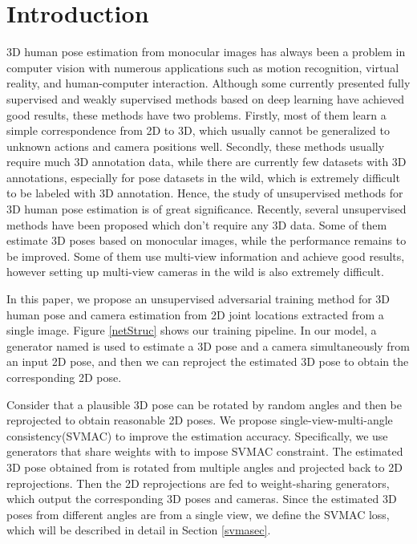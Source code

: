 \documentclass[10pt,twocolumn,letterpaper]{article}
\begin{document}
\section{Introduction}
3D human pose estimation from monocular images has always been a problem in computer vision\cite{0Computational, 1983Model} with numerous applications such as motion recognition, virtual reality, and human-computer interaction. Although some currently presented fully supervised and weakly supervised methods based on deep learning have achieved good results\cite{2017Exploiting, 2017A, 2017VNect, ferrari_integral_2018,  2017Lifting}, these methods have two problems. Firstly, most of them learn a simple correspondence from 2D to 3D, which usually cannot be generalized to unknown actions and camera positions well. Secondly, these methods usually require much 3D annotation data, while there are currently few datasets with 3D annotations, especially for pose datasets in the wild, which is extremely difficult to be labeled with 3D annotation. 
Hence, the study of unsupervised methods for 3D human pose estimation is of great significance. 
Recently, several unsupervised methods have been proposed which don't require any 3D data. Some of them estimate 3D poses based on monocular images\cite{2020Unsupervised,2018Unsupervised,2020Kundu}, while the performance remains to be improved. Some of them use multi-view information and achieve good results\cite{2020Weakly,2019Self,2019WeaklyR,2020canonpose}, however setting up multi-view cameras in the wild is also extremely difficult.

In this paper, we propose an unsupervised adversarial training method for 3D human pose and camera estimation from 2D joint locations extracted from a single image. Figure \ref{netStruc} shows our training pipeline. In our model, a generator named  is used to estimate a 3D pose and a camera simultaneously from an input 2D pose, and then we can reproject the estimated 3D pose to obtain the corresponding 2D pose.

Consider that a plausible 3D pose can be rotated by random angles and then be reprojected to obtain reasonable 2D poses. We propose single-view-multi-angle consistency(SVMAC) to improve the estimation accuracy. 
Specifically, we use generators that share weights with  to impose SVMAC constraint. The estimated 3D pose obtained from  is rotated from multiple angles and projected back to 2D reprojections. Then the 2D reprojections are fed to weight-sharing generators, which output the corresponding 3D poses and cameras. Since the estimated 3D poses from different angles are from a single view, we define the SVMAC loss, which will be described in detail in Section \ref{svmasec}. 
\end{document}
